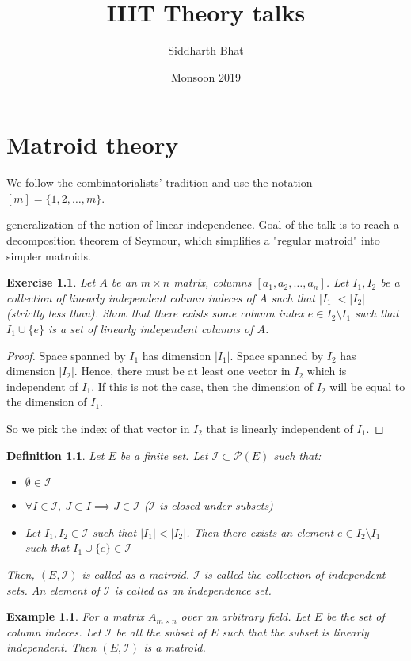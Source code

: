 \documentclass[11pt]{book}
\title{IIIT Theory talks}
\author{Siddharth Bhat}
\date{Monsoon 2019}
\newcommand{\I}{\ensuremath{\mathcal{I}} }
\newcommand{\powerset}{\mathcal{P}}
\newtheorem{definition}{Definition}
\newtheorem{proof}{Proof}
\newtheorem{exercise}{Exercise}
\newtheorem{example}{Example}
\begin{document}
\maketitle
\tableofcontents

\chapter{Matroid theory}

We follow the combinatorialists' tradition and use  the notation 
${[m] = \{ 1, 2, \dots, m \}}$.

generalization of the notion of linear independence. Goal of the talk is to 
reach a decomposition theorem of Seymour, which simplifies a "regular matroid"
into simpler matroids.

\begin{exercise}
Let $A$ be an $m \times n$ matrix, columns $[a_1, a_2, \dots, a_n]$.
Let $I_1, I_2$ be a collection of linearly independent column indeces of $A$ such
that $|I_1| < |I_2|$ (\textit{strictly} less than). Show that there exists some column index ${e \in I_2 \setminus I_1}$
such that ${I_1 \cup \{e \}}$ is a set of linearly independent columns of $A$.
\end{exercise}
\begin{proof}
    Space spanned by $I_1$ has dimension $|I_1|$. Space spanned by $I_2$
    has dimension $|I_2|$. Hence, there must be at least one vector in $I_2$
    which is independent of $I_1$. If this is not the case, then the dimension of $I_2$
    will be equal to the dimension of $I_1$.

    So we pick the index of that vector in $I_2$ that is linearly independent of $I_1$.
\end{proof}

\begin{definition}
    Let $E$ be a finite set. Let $\I \subset \powerset(E)$ such that:
    \begin{itemize}
        \item $\emptyset \in \I$
        \item  $\forall I \in \I, ~ J \subset I \implies J \in \I$ (\I is closed under subsets)
        \item Let $I_1, I_2 \in \I$ such that $|I_1| < |I_2|$. Then there
            exists an element $e \in I_2 \setminus I_1$ such that $I_1 \cup \{ e \} \in \I$
    \end{itemize}
    Then, $(E, \I)$ is called as a matroid. \I is called the collection of independent sets. An
    element of \I is called as an independence set.
\end{definition}

\begin{example}
    For a matrix $A_{m \times n}$ over an arbitrary field. Let $E$ be the set
    of column indeces. Let $\I$ be all the subset of $E$ such that the subset 
    is linearly independent. Then $(E, \I)$ is a matroid.
\end{example}
\end{document}
